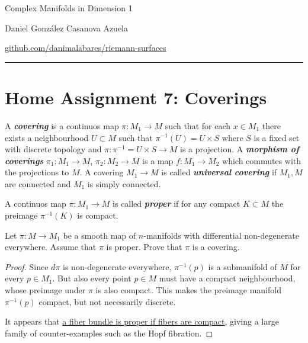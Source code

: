 \documentclass{article}
\begin{document}
\begin{minipage}{\textwidth}
	\begin{minipage}{.5\textwidth}
		Complex Manifolds in Dimension 1
	\end{minipage}%
	\begin{minipage}{.5\textwidth}
		\raggedleft
		Daniel González Casanova Azuela\par
		{\small\href{https://github.com/danimalabares/riemann-surfaces}{github.com/danimalabares/riemann-surfaces}}
	\end{minipage}%
\end{minipage}\vspace{.2cm}\hrule
\section{Home Assignment 7: Coverings}
\setcounter{section}{7}
\begin{defn}
	A \textbf{\textit{covering}} is a continuos map $\pi:M_1\to M$ such that for each $x\in M_1$ there exists a neighbourhood $U\subset M$ such that $\pi^{-1}(U)=U\times S$ where $S$ is a fixed set with discrete topology and $\pi:\pi^{-1}=U\times S\to M$ is a projection. A \textbf{\textit{morphism of coverings}} $\pi_1:M_1\to M$, $\pi_2:M_2\to M$ is a map $f:M_1\to M_2$ which commutes with the projections to $M$. A covering $M_1\to M$ is called \textbf{\textit{universal covering}} if $M_1, M$ are connected and $M_1$ is simply connected.
\end{defn}
\begin{defn}
	A continuos map $\pi:M_1\to M$ is called \textbf{\textit{proper}} if for any compact $K\subset M$ the preimage $\pi^{-1}(K)$ is compact.
\end{defn}
\begin{exercise}
	Let $\pi : M\to M_1$ be a smooth map of $n$-manifolds with differential non-degenerate everywhere. Assume that $\pi$ is proper. Prove that $\pi$ is a covering.
\end{exercise}
\begin{proof}
	Since $d\pi$ is non-degenerate everywhere, $\pi^{-1}(p)$ is a submanifold of $M$ for every $p\in M_1$. But also every point $p\in M$ must have a compact neighbourhood, whose preimage under $\pi$ is also compact. This makes the preimage manifold $\pi^{-1}(p)$ compact, but not necessarily discrete.
	
	It appears that \href{https://math.stackexchange.com/questions/4384022/fiber-bundle-map-is-proper-if-the-model-fiber-is-compact?noredirect=1&lq=1}{a fiber bundle is proper if fibers are compact}, giving a large family of counter-examples such as the Hopf fibration.
\end{proof}
\end{document}

